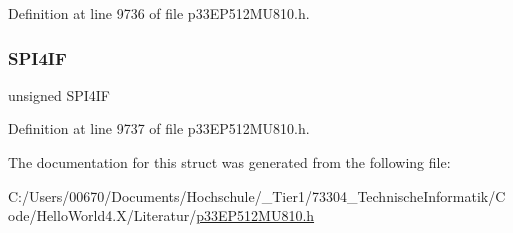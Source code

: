 Definition at line 9736 of file p33\+E\+P512\+M\+U810.\+h.

\mbox{\label{structtag_i_f_s7_b_i_t_s_a5c32739c7336df804fa9a1506c8d5bc7}} 
\subsubsection{\texorpdfstring{S\+P\+I4\+IF}{SPI4IF}}
{\footnotesize\ttfamily unsigned S\+P\+I4\+IF}



Definition at line 9737 of file p33\+E\+P512\+M\+U810.\+h.



The documentation for this struct was generated from the following file\+:\begin{DoxyCompactItemize}
\item 
C\+:/\+Users/00670/\+Documents/\+Hochschule/\+\_\+\+Tier1/73304\+\_\+\+Technische\+Informatik/\+Code/\+Hello\+World4.\+X/\+Literatur/\hyperlink{p33_e_p512_m_u810_8h}{p33\+E\+P512\+M\+U810.\+h}\end{DoxyCompactItemize}
